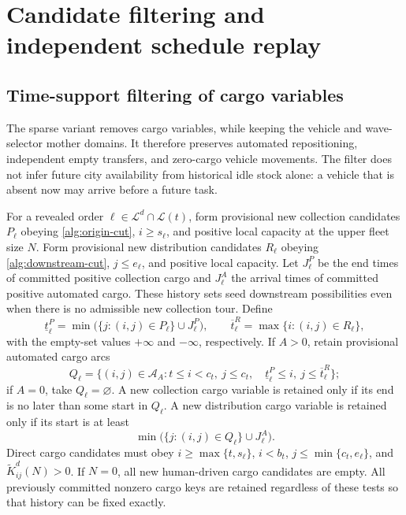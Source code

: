 \section{Candidate filtering and independent schedule replay}
\label{app:implementation}

\subsection{Time-support filtering of cargo variables}
\label{app:filter}

The sparse variant removes cargo variables, while keeping the vehicle and
wave-selector mother domains. It therefore preserves automated repositioning,
independent empty transfers, and zero-cargo vehicle movements. The filter
does not infer future city availability from historical idle stock alone:
a vehicle that is absent now may arrive before a future task.

For a revealed order $\ell\in\mathcal L^d\cap\mathcal L(t)$, form provisional new
collection candidates $P_\ell$ obeying \eqref{alg:origin-cut},
$i\geq s_\ell$, and positive local capacity at the upper fleet size $N$.
Form provisional new distribution candidates $R_\ell$ obeying
\eqref{alg:downstream-cut}, $j\leq e_\ell$, and positive local capacity.
Let $J^P_\ell$ be the end times of committed positive collection cargo and
$J^A_\ell$ the arrival times of committed positive automated cargo. These
history sets seed downstream possibilities even when there is no admissible
new collection tour. Define
\begin{equation}
 \underline t_\ell^P=\min\bigl(\{j:(i,j)\in P_\ell\}\cup J^P_\ell\bigr),
 \qquad
 \overline t_\ell^R=\max\{i:(i,j)\in R_\ell\},
 \label{alg:time-bounds}
\end{equation}
with the empty-set values $+\infty$ and $-\infty$, respectively. If
$A>0$, retain provisional automated cargo arcs
\begin{equation}
 Q_\ell=\{(i,j)\in\mathcal A_A:
 t\leq i<c_t,\ j\leq c_t,\quad
 \underline t_\ell^P\leq i,\ j\leq\overline t_\ell^R\};
 \label{alg:auto-support}
\end{equation}
if $A=0$, take $Q_\ell=\varnothing$. A new collection cargo variable is
retained only if its end is no later than some start in $Q_\ell$.
A new distribution cargo variable is retained only if its start is at least
\begin{equation}
 \min\bigl(\{j:(i,j)\in Q_\ell\}\cup J^A_\ell\bigr).
 \label{alg:delivery-support}
\end{equation}
Direct cargo candidates must obey $i\geq\max\{t,s_\ell\}$,
$i<b_t$, $j\leq\min\{c_t,e_\ell\}$, and
$\widetilde K^d_{ij}(N)>0$. If $N=0$, all new human-driven cargo
candidates are empty. All previously committed nonzero cargo keys are
retained regardless of these tests so that history can be fixed exactly.

